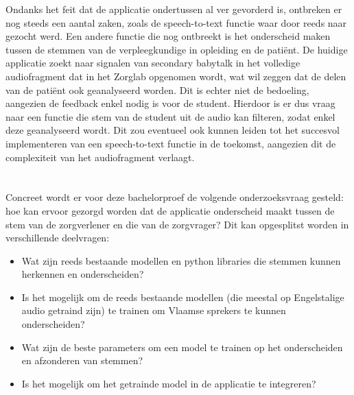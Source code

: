 Ondanks het feit dat de applicatie ondertussen al ver gevorderd is, ontbreken er nog steeds een aantal zaken, zoals de speech-to-text functie waar door \textcite{Schryver2024} reeds naar gezocht werd. Een andere functie die nog ontbreekt is het onderscheid maken tussen de stemmen van de verpleegkundige in opleiding en de patiënt. De huidige applicatie zoekt naar signalen van secondary babytalk in het volledige audiofragment dat in het Zorglab opgenomen wordt, wat wil zeggen dat de delen van de patiënt ook geanalyseerd worden. Dit is echter niet de bedoeling, aangezien de feedback enkel nodig is voor de student. Hierdoor is er dus vraag naar een functie die stem van de student uit de audio kan filteren, zodat enkel deze geanalyseerd wordt. Dit zou eventueel ook kunnen leiden tot het succesvol implementeren van een speech-to-text functie in de toekomst, aangezien dit de complexiteit van het audiofragment verlaagt.

\section{}%
\label{sec:onderzoeksvraag}

Concreet wordt er voor deze bachelorproef de volgende onderzoeksvraag gesteld: hoe kan ervoor gezorgd worden dat de applicatie onderscheid maakt tussen de stem van de zorgverlener en die van de zorgvrager? Dit kan opgesplitst worden in verschillende deelvragen:
\begin{itemize}
	\item Wat zijn reeds bestaande modellen en python libraries die stemmen kunnen herkennen en onderscheiden?
	\item Is het mogelijk om de reeds bestaande modellen (die meestal op Engelstalige audio getraind zijn) te trainen om Vlaamse sprekers te kunnen onderscheiden?
	\item Wat zijn de beste parameters om een model te trainen op het onderscheiden en afzonderen van stemmen?
	\item Is het mogelijk om het getrainde model in de applicatie te integreren?
\end{itemize} 

\section{}%
\label{sec:onderzoeksdoelstelling}

